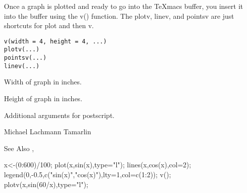 \begin{Description}\relax
Once a graph is plotted and ready to go into the TeXmacs buffer,
you insert it into the buffer using the v() function. The plotv,
linev, and pointsv are just shortcuts for plot and then v.\end{Description}
\begin{Usage}
\begin{verbatim}
v(width = 4, height = 4, ...)
plotv(...)
pointsv(...)
linev(...)
\end{verbatim}
\end{Usage}
\begin{Arguments}
\begin{ldescription}
\item[\code{width}] Width of graph in inches. 
\item[\code{height}] Height of graph in inches. 
\item[\code{...}] Additional arguments for postscript. 
\end{ldescription}
\end{Arguments}
\begin{Author}\relax
Michael Lachmann Tamarlin\end{Author}
\begin{SeeAlso}\relax
See Also ,\end{SeeAlso}
\begin{Examples}
\begin{ExampleCode}
x<-(0:600)/100;
plot(x,sin(x),type="l");
lines(x,cos(x),col=2);
legend(0,-0.5,c("sin(x)","cos(x)"),lty=1,col=c(1:2));
v();
plotv(x,sin(60/x),type="l");
\end{ExampleCode}
\end{Examples}


